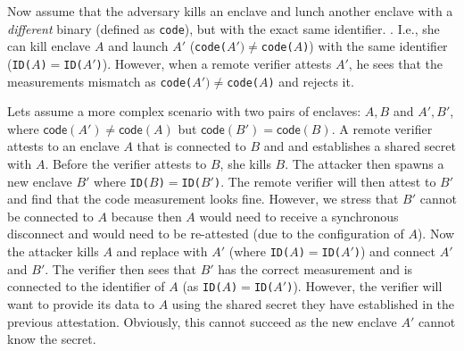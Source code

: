 Now assume that the adversary kills an enclave and lunch another enclave with a \emph{different} binary (defined as \texttt{code}), but with the exact same identifier. . I.e., she can kill enclave $A$ and launch $A'$ (\texttt{code($A')\neq$code($A$)}) with the same identifier (\texttt{ID($A$)$=$ID($A'$)}). However, when a remote verifier attests $A'$, he sees that the measurements mismatch as \texttt{code($A')\neq$code($A$)} and rejects it.

Lets assume a more complex scenario with two pairs of enclaves: $A, B$ and $A', B'$, where $\textsf{code} (A')\neq \textsf{code} (A)$ but $\textsf{code} (B') = \textsf{code} (B)$. 
A remote verifier attests to an enclave $A$ that is connected to $B$ and and establishes a shared secret with $A$. Before the verifier attests to $B$, she kills $B$. The attacker then spawns a new enclave $B'$ where \texttt{ID($B$)$=$ID($B'$)}. The remote verifier will then attest to $B'$ and find that the code measurement looks fine. However, we stress that $B'$ cannot be connected to $A$ because then $A$ would need to receive a synchronous disconnect and would need to be re-attested (due to the configuration of $A$). Now the attacker kills $A$ and replace with $A'$ (where \texttt{ID($A$)$=$ID($A'$)}) and connect $A'$ and $B'$. The verifier then sees that $B'$ has the correct measurement and is connected to the identifier of $A$ (as \texttt{ID($A$)$=$ID($A'$)}). However, the verifier will want to provide its data to $A$ using the shared secret they have established in the previous attestation. Obviously, this cannot succeed as the new enclave $A'$ cannot know the secret.
 
